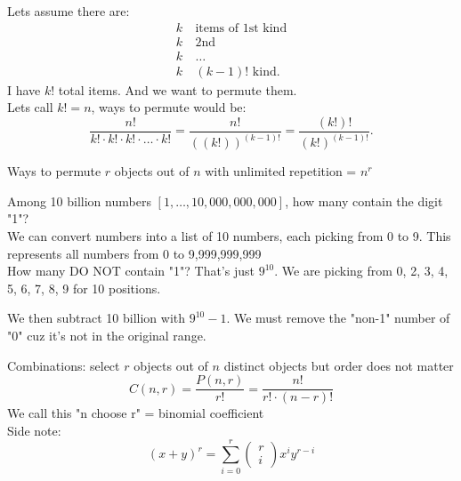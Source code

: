 \begin{itemize}
\begin{example}
			Lets assume there are: 
			\begin{align*}
				k~ &\text{items of 1st kind}\\
				k~ & \text{2nd}\\
				k~ & \ldots\\
				k~ & \left( k-1 \right) ! \text{ kind}
			.\end{align*}
			I have $k!$ total items. And we want to permute them. \\
			Lets call $k! = n$, ways to permute would be:
			\[
			\frac{n!}{k! \cdot k! \cdot k! \cdot \ldots \cdot k!} = \frac{n!}{\left( (k!) \right) ^{\left( k-1 \right) !}} = \frac{\left( k! \right) !}{\left( k! \right) ^{\left( k-1 \right) !}}
			.\] 
		\end{example}
		\begin{theorem}
			Ways to permute $r$ objects out of $n$ with unlimited repetition = $n^{r}$
		\end{theorem}
		\begin{example}
			Among 10 billion numbers $[1, \ldots, 10,000,000,000]$, how many contain the digit "1"?\\
			We can convert numbers into a list of 10 numbers, each picking from 0 to 9. This represents all numbers from 0 to 9,999,999,999\\

			How many DO NOT contain "1"? That's just $9^{10}$. We are picking from 0, 2, 3, 4, 5, 6, 7, 8, 9 for 10 positions.

			We then subtract 10 billion with $9^{10}-1$. We must remove the "non-1" number of "0" cuz it's not in the original range.
		\end{example}
		\begin{theorem}
			Combinations: select $r$ objects out of $n$ distinct objects but order does not matter\\
			 \begin{equation}
			 	C\left( n,r \right) = \frac{P\left( n,r \right) }{r!} =  \frac{n!}{r! \cdot  \left( n-r \right) !}
			 \end{equation}
			 We call this "n choose r" = binomial coefficient\\
			 Side note: 
			 \begin{equation}
				 \left( x+y \right) ^{r} = \sum_{i=0}^{r} \begin{pmatrix} r \\ i \end{pmatrix} x^{i}y^{r-i}
			 \end{equation}


\end{theorem}
\end{itemize}
